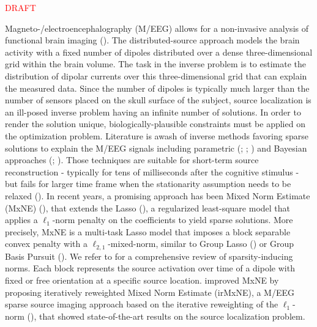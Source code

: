\textcolor{red}{DRAFT}

Magneto-/electroencephalography (M/EEG) allows for a non-invasive analysis of
functional brain imaging (\cite{Baillet_Mosher_Leahy_2001}). The distributed-source approach models the brain activity
with a fixed number of dipoles distributed over a dense three-dimensional 
grid within the brain volume. The task in the inverse problem is to estimate the 
distribution of dipolar currents over this three-dimensional grid that can explain the 
measured data. Since the number of dipoles is typically much larger than the number 
of sensors placed on the skull surface of the subject, source localization is an 
ill-posed inverse problem having an infinite number of solutions. In order to render
the solution unique, biologically-plausible constraints must be applied on the optimization
problem. Literature is awash of inverse methods favoring sparse solutions to explain the
M/EEG signals including parametric (\cite{Huang_Breheny_Ma_2012}; \cite{Matsuura_Okabe_1995}; 
\cite{Uutela_Hamalainen_Somersalo_1999}) and Bayesian approaches (\cite{Costa_Batatia_Oberlin_DGiano_Tourneret_2017}; 
\cite{Oikonomou_Kompatsiaris_2020}). Those techniques are suitable for short-term source reconstruction 
- typically for tens of milliseconds after the cognitive stimulus - but fails for larger time frame when the 
stationarity assumption needs to be relaxed (\cite{Gramfort_Strohmeier_Haueisen_Hamalainen_Kowalski13}). 
In recent years, a promising approach has been Mixed Norm Estimate (MxNE) 
(\cite{Gramfort_Kowalski_Hamalainen12}), that extends the Lasso (\cite{Tibshirani96}), 
a regularized least-square model that applies a $\ell_1$-norm penalty on the coefficients to yield 
sparse solutions. More precisely, MxNE is a multi-task Lasso
model that imposes a block separable convex penalty with a $\ell_{2,1}$-mixed-norm, similar to 
Group Lasso (\cite{Yuan_Lin06}) or Group Basis Pursuit (\cite{Liao_Li_Carin_2014}). We refer to 
\cite{Bach_Jenatton_Mairal_Obozinski12} for a comprehensive review of sparsity-inducing norms. 
Each block represents the source activation over time of a dipole with fixed or free orientation at a specific source location.
\cite{Strohmeier_Bekhti_Haueisen_Gramfort_2016} improved MxNE by proposing iteratively reweighted Mixed Norm Estimate 
(irMxNE), a M/EEG sparse source imaging approach based on the iterative reweighting of the $\ell_1$-
norm (\cite{Candes_Wakin_Boyd08}), that showed state-of-the-art results on the source localization
problem.

